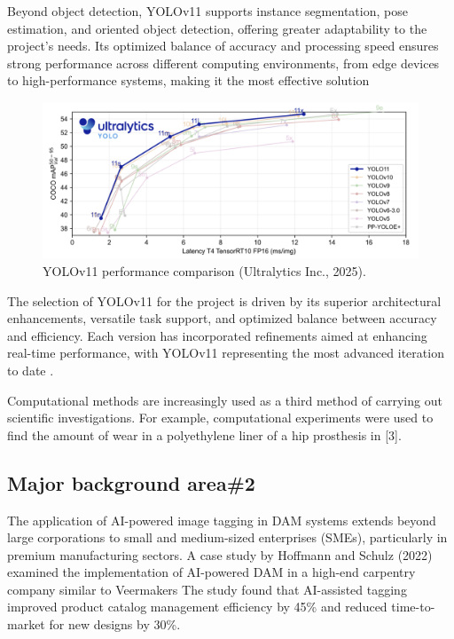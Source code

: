\documentclass[a4paper,10pt,twocolumn]{article}
\numberwithin{figure}{section}
\numberwithin{table}{section}
\begin{document}
\vspace{0.3cm}
Beyond object detection, YOLOv11 supports instance segmentation, 
pose estimation, and oriented object detection, offering greater adaptability 
to the project’s needs. Its optimized balance of accuracy and processing speed 
ensures strong performance across different computing environments, from edge 
devices to high-performance systems, making it the most effective solution





\begin{figure}[h]
    \centering
    \includegraphics[width=1\linewidth]{YOLOV11.png}  %
    \caption{YOLOv11 performance comparison (Ultralytics Inc., 2025).}
    \label{fig:bench}  
\end{figure}

The selection of YOLOv11 for the project is driven by its superior architectural 
enhancements, versatile task support, and optimized balance between accuracy and 
efficiency. 
  Each version has incorporated refinements aimed at enhancing real-time performance, 
  with YOLOv11 representing the most advanced iteration to date \citep{khanam2024yolov11overviewkeyarchitectural}.
\vspace{0.3cm}

Computational methods are increasingly used as a third method of carrying out scientific
investigations. For example, computational experiments were used to find the amount of wear in a
polyethylene liner of a hip prosthesis in [3].

\subsection{Major background area\#2}
The application of AI-powered image tagging in DAM systems extends beyond large corporations 
to small and medium-sized enterprises (SMEs), particularly in premium manufacturing sectors. A case study 
by Hoffmann and Schulz (2022) examined the implementation of AI-powered DAM in a high-end carpentry 
company similar to Veermakers
The study found that AI-assisted tagging improved product catalog management 
efficiency by 45\% and reduced time-to-market for new designs by 30\%.
\end{document}
